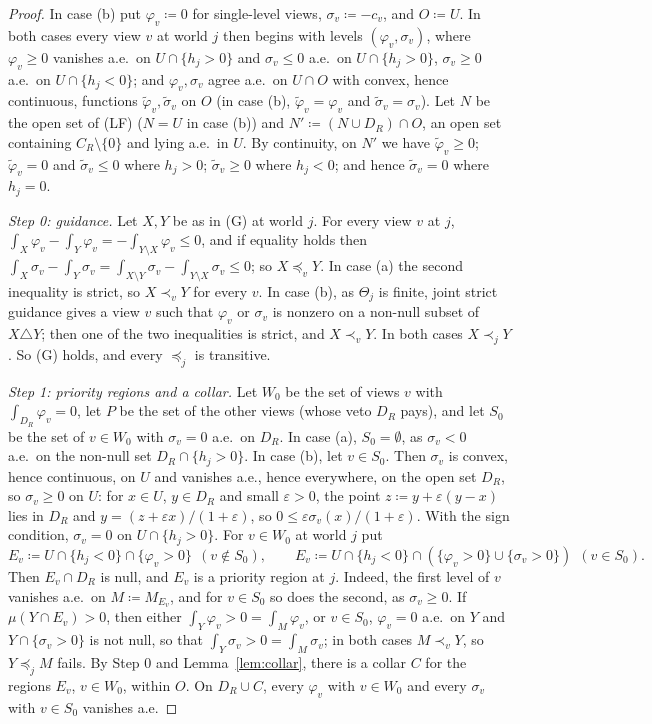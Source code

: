 \documentclass[11pt]{article}
\theoremstyle{plain}
\theoremstyle{definition}
\theoremstyle{remark}
\begin{document}
\begin{proof}
In case (b) put $\varphi_v\coloneqq0$ for single-level views, $\sigma_v\coloneqq-c_v$,
and $O\coloneqq U$. In both cases every view $v$ at world $j$ then begins with levels
$(\varphi_v,\sigma_v)$, where $\varphi_v\ge0$ vanishes a.e.\ on $U\cap\{h_j>0\}$ and
$\sigma_v\le0$ a.e.\ on $U\cap\{h_j>0\}$, $\sigma_v\ge0$ a.e.\ on $U\cap\{h_j<0\}$; and
$\varphi_v,\sigma_v$ agree a.e.\ on $U\cap O$ with convex, hence continuous, functions
$\tilde\varphi_v,\tilde\sigma_v$ on $O$ (in case (b), $\tilde\varphi_v=\varphi_v$ and
$\tilde\sigma_v=\sigma_v$). Let $N$ be the open set of (LF) ($N=U$ in case (b)) and
$N'\coloneqq(N\cup D_R)\cap O$, an open set containing $C_R\setminus\{0\}$ and lying a.e.\
in $U$. By continuity, on $N'$ we have $\tilde\varphi_v\ge0$; $\tilde\varphi_v=0$ and
$\tilde\sigma_v\le0$ where $h_j>0$; $\tilde\sigma_v\ge0$ where $h_j<0$; and hence
$\tilde\sigma_v=0$ where $h_j=0$.

\emph{Step 0: guidance.} Let $X,Y$ be as in (G) at world $j$. For every view $v$ at $j$,
$\int_X\varphi_v-\int_Y\varphi_v=-\int_{Y\setminus X}\varphi_v\le0$, and if equality holds
then $\int_X\sigma_v-\int_Y\sigma_v=\int_{X\setminus Y}\sigma_v-\int_{Y\setminus X}
\sigma_v\le0$; so $X\preceq_vY$. In case (a) the second inequality is strict, so
$X\prec_vY$ for every $v$. In case (b), as $\Theta_j$ is finite, joint strict guidance
gives a view $v$ such that $\varphi_v$ or $\sigma_v$ is nonzero on a non-null subset of
$X\triangle Y$; then one of the two inequalities is strict, and $X\prec_vY$. In both cases
$X\prec_jY$. So (G) holds, and every $\preceq_j$ is transitive.

\emph{Step 1: priority regions and a collar.} Let $W_0$ be the set of views $v$ with
$\int_{D_R}\varphi_v=0$, let $P$ be the set of the other views (whose veto $D_R$ pays),
and let $S_0$ be the set of $v\in W_0$ with $\sigma_v=0$ a.e.\ on $D_R$. In case (a),
$S_0=\emptyset$, as $\sigma_v<0$ a.e.\ on the non-null set $D_R\cap\{h_j>0\}$. In case (b),
let $v\in S_0$. Then $\sigma_v$ is convex, hence continuous, on $U$ and vanishes a.e., hence everywhere,
on the open set $D_R$, so
$\sigma_v\ge0$ on $U$: for $x\in U$, $y\in D_R$ and small $\varepsilon>0$, the point
$z\coloneqq y+\varepsilon(y-x)$ lies in $D_R$ and $y=(z+\varepsilon x)/(1+\varepsilon)$,
so $0\le\varepsilon\sigma_v(x)/(1+\varepsilon)$. With the sign condition, $\sigma_v=0$ on
$U\cap\{h_j>0\}$. For $v\in W_0$ at world $j$ put
\[
  E_v\coloneqq U\cap\{h_j<0\}\cap\{\varphi_v>0\}\ \ (v\notin S_0),\qquad
  E_v\coloneqq U\cap\{h_j<0\}\cap(\{\varphi_v>0\}\cup\{\sigma_v>0\})\ \ (v\in S_0).
\]
Then $E_v\cap D_R$ is null, and $E_v$ is a priority region at $j$. Indeed, the first level
of $v$ vanishes a.e.\ on $M\coloneqq M_{E_v}$, and for $v\in S_0$ so does the second,
as $\sigma_v\ge0$. If $\mu(Y\cap E_v)>0$, then either $\int_Y\varphi_v>0=\int_M
\varphi_v$, or $v\in S_0$, $\varphi_v=0$ a.e.\ on $Y$ and $Y\cap\{\sigma_v>0\}$ is not
null, so that $\int_Y\sigma_v>0=\int_M\sigma_v$; in both cases $M\prec_vY$, so
$Y\preceq_jM$ fails. By Step 0 and
Lemma~\ref{lem:collar}, there is a collar $C$ for the regions $E_v$, $v\in W_0$, within $O$.
On $D_R\cup C$, every $\varphi_v$ with $v\in W_0$ and every $\sigma_v$ with $v\in S_0$
vanishes a.e.


\end{proof}
\end{document}
